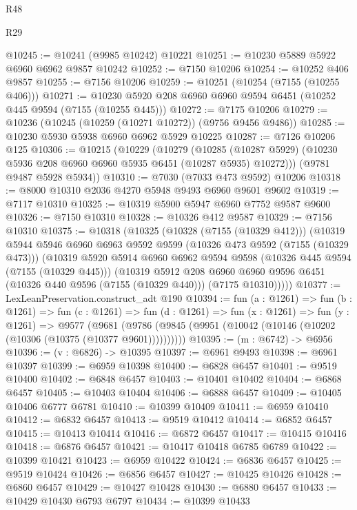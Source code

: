 \begin{lexlean}{R48}
\begin{lexlean}{R29}
\begin{coremodule}
{{{{{{{{{{{{{{{{{{{{{{{{{{{{{{{{{{{{{{{{{{{{{{{{{{{{{{{{{{{{{{{{{{{{{{{{{{{{{{{{{{{{{{{{{{{{{{{{{{{{{{{{{{{{{{{{{{{{{{{{{{{{{{{{{{{{{{{{{{{{{{{{{{{{{{{{{{{{{{{{{{{{{{{{{{{{{{{{{{{{{{{{{{{{{{{{{{{{{{{{{{{{{{{{{{{{{{{{{{@10245 := @10241 (@9985 @10242) @10221
@10251 := @10230 @5889 @5922 @6960 @6962 @9857 @10242
@10252 := @7150 @10206
@10254 := @10252 @406 @9857
@10255 := @7156 @10206
@10259 := @10251 (@10254 (@7155 (@10255 @406)))
@10271 := @10230 @5920 @208 @6960 @6960 @9594 @6451 (@10252 @445 @9594 (@7155 (@10255 @445)))
@10272 := @7175 @10206
@10279 := @10236 (@10245 (@10259 (@10271 @10272)) (@9756 @9456 @9486))
@10285 := @10230 @5930 @5938 @6960 @6962 @5929 @10225
@10287 := @7126 @10206 @125
@10306 := @10215
    (@10229
      (@10279
        (@10285 (@10287 @5929) (@10230 @5936 @208 @6960 @6960 @5935 @6451 (@10287 @5935) @10272)))
      (@9781 @9487 @5928 @5934))
@10310 := @7030 (@7033 @473 @9592) @10206
@10318 := @8000 @10310 @2036 @4270 @5948 @9493 @6960 @9601 @9602
@10319 := @7117 @10310
@10325 := @10319 @5900 @5947 @6960 @7752 @9587 @9600
@10326 := @7150 @10310
@10328 := @10326 @412 @9587
@10329 := @7156 @10310
@10375 := @10318
    (@10325
      (@10328 (@7155 (@10329 @412)))
      (@10319
        @5944
        @5946
        @6960
        @6963
        @9592
        @9599
        (@10326 @473 @9592 (@7155 (@10329 @473)))
        (@10319
          @5920
          @5914
          @6960
          @6962
          @9594
          @9598
          (@10326 @445 @9594 (@7155 (@10329 @445)))
          (@10319
            @5912
            @208
            @6960
            @6960
            @9596
            @6451
            (@10326 @440 @9596 (@7155 (@10329 @440)))
            (@7175 @10310)))))
@10377 := LexLeanPreservation.construct_adt @190
@10394 := fun (a : @1261) =>
  fun (b : @1261) =>
  fun (c : @1261) =>
  fun (d : @1261) =>
  fun (x : @1261) =>
  fun (y : @1261) =>
  @9577 (@9681 (@9786 (@9845 (@9951 (@10042 (@10146 (@10202 (@10306 (@10375 (@10377 @9601))))))))))
@10395 := (m : @6742) -> @6956
@10396 := (v : @6826) -> @10395
@10397 := @6961 @9493
@10398 := @6961 @10397
@10399 := @6959 @10398
@10400 := @6828 @6457
@10401 := @9519 @10400
@10402 := @6848 @6457
@10403 := @10401 @10402
@10404 := @6868 @6457
@10405 := @10403 @10404
@10406 := @6888 @6457
@10409 := @10405 @10406 @6777 @6781
@10410 := @10399 @10409
@10411 := @6959 @10410
@10412 := @6832 @6457
@10413 := @9519 @10412
@10414 := @6852 @6457
@10415 := @10413 @10414
@10416 := @6872 @6457
@10417 := @10415 @10416
@10418 := @6876 @6457
@10421 := @10417 @10418 @6785 @6789
@10422 := @10399 @10421
@10423 := @6959 @10422
@10424 := @6836 @6457
@10425 := @9519 @10424
@10426 := @6856 @6457
@10427 := @10425 @10426
@10428 := @6860 @6457
@10429 := @10427 @10428
@10430 := @6880 @6457
@10433 := @10429 @10430 @6793 @6797
@10434 := @10399 @10433
}}}}}}}}}}}}}}}}}}}}}}}}}}}}}}}}}}}}}}}}}}}}}}}}}}}}}}}}}}}}}}}}}}}}}}}}}}}}}}}}}}}}}}}}}}}}}}}}}}}}}}}}}}}}}}}}}}}}}}}}}}}}}}}}}}}}}}}}}}}}}}}}}}}}}}}}}}}}}}}}}}}}}}}}}}}}}}}}}}}}}}}}}}}}}}}}}}}}}}}}}}}}}}}}}}}}}}}}}}
\end{coremodule}
\end{lexlean}
\end{lexlean}
